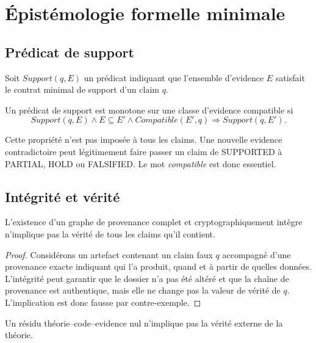 \chapter{Épistémologie formelle minimale}

\section{Prédicat de support}

Soit $Support(q,E)$ un prédicat indiquant que l'ensemble d'evidence $E$ satisfait le contrat minimal de support d'un claim $q$.

\begin{definition}
Un prédicat de support est monotone sur une classe d'evidence compatible si
\[
Support(q,E)\land E\subseteq E'\land Compatible(E',q)
\Rightarrow Support(q,E').
\]
\end{definition}

\begin{observation}
Cette propriété n'est pas imposée à tous les claims. Une nouvelle evidence contradictoire peut légitimement faire passer un claim de SUPPORTED à PARTIAL, HOLD ou FALSIFIED. Le mot \emph{compatible} est donc essentiel.
\end{observation}

\section{Intégrité et vérité}

\begin{proposition}
L'existence d'un graphe de provenance complet et cryptographiquement intègre n'implique pas la vérité de tous les claims qu'il contient.
\end{proposition}

\begin{proof}
Considérons un artefact contenant un claim faux $q$ accompagné d'une provenance exacte indiquant qui l'a produit, quand et à partir de quelles données. L'intégrité peut garantir que le dossier n'a pas été altéré et que la chaîne de provenance est authentique, mais elle ne change pas la valeur de vérité de $q$. L'implication est donc fausse par contre-exemple.
\end{proof}

\begin{proposition}
Un résidu théorie--code--evidence nul n'implique pas la vérité externe de la théorie.
\end{proposition}

